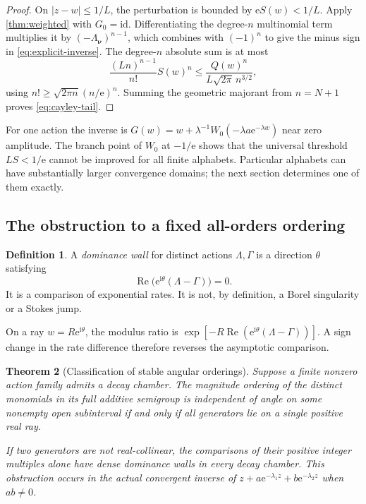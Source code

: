 \documentclass[11pt,a4paper]{article}
\numberwithin{equation}{section}
\newtheorem{theorem}{Theorem}[section]
\theoremstyle{definition}
\newtheorem{definition}[theorem]{Definition}
\theoremstyle{remark}
\newcommand{\ii}{\mathrm i}
\newcommand{\e}{\mathrm e}
\newcommand{\id}{\mathrm{id}}
\newcommand{\Rea}{\operatorname{Re}}
\newcommand{\nn}{\boldsymbol\nu}
\begin{document}
\begin{proof}
On $|z-w|\le1/L$, the perturbation is bounded by $\e S(w)<1/L$.
Apply \cref{thm:weighted} with $G_0=\id$. Differentiating the degree-$n$
multinomial term multiplies it by $(-\Lambda_{\nn})^{n-1}$, which combines
with $(-1)^n$ to give the minus sign in \eqref{eq:explicit-inverse}.
The degree-$n$ absolute sum is at most
\begin{equation}\label{eq:cayley-degree}
 \frac{(Ln)^{n-1}}{n!}S(w)^n
 \le\frac{Q(w)^n}{L\sqrt{2\pi}\,n^{3/2}},
\end{equation}
using $n!\ge\sqrt{2\pi n}(n/\e)^n$. Summing the geometric majorant
from $n=N+1$ proves \eqref{eq:cayley-tail}.
\end{proof}

For one action the inverse is
$G(w)=w+\lambda^{-1}W_0(-\lambda a\e^{-\lambda w})$ near zero amplitude.
The branch point of $W_0$ at $-1/\e$ shows that the universal threshold
$LS<1/\e$ cannot be improved for all finite alphabets. Particular
alphabets can have substantially larger convergence domains; the next
section determines one of them exactly.

\subsection{The obstruction to a fixed all-orders ordering}

\begin{definition}
A \emph{dominance wall} for distinct actions $\Lambda,\Gamma$ is a
direction $\theta$ satisfying
\begin{equation}\label{eq:wall}
 \Rea\bigl(\e^{\ii\theta}(\Lambda-\Gamma)\bigr)=0.
\end{equation}
It is a comparison of exponential rates. It is not, by definition,
a Borel singularity or a Stokes jump.
\end{definition}

On a ray $w=R\e^{\ii\theta}$, the modulus ratio is
$\exp[-R\Rea(\e^{\ii\theta}(\Lambda-\Gamma))]$. A sign change in the
rate difference therefore reverses the asymptotic comparison.

\begin{theorem}[Classification of stable angular orderings]\label{thm:dense-walls}
Suppose a finite nonzero action family admits a decay chamber. The
magnitude ordering of the distinct monomials in its full additive
semigroup is independent of angle on some nonempty open subinterval
if and only if all generators lie on a single positive real ray.

If two generators are not real-collinear, the comparisons of their
positive integer multiples alone have dense dominance walls in every
decay chamber. This obstruction occurs in the actual convergent inverse
of $z+a\e^{-\lambda_1z}+b\e^{-\lambda_2z}$ when $ab\ne0$.
\end{theorem}
\end{document}
